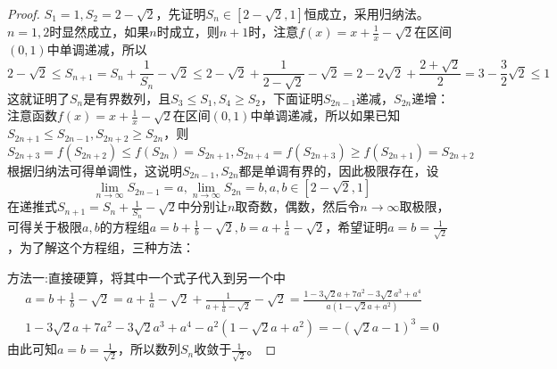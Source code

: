 \documentclass[../../main.tex]{subfiles}%
\begin{document}
\begin{proof}
\(S_1 = 1,S_2 = 2-\sqrt{2}\)，先证明\(S_n\in[2 - \sqrt{2},1]\)恒成立，采用归纳法。
\(n = 1,2\)时显然成立，如果\(n\)时成立，则\(n + 1\)时，注意\(f(x)=x+\frac{1}{x}-\sqrt{2}\)在区间\((0,1)\)中单调递减，所以
\[2-\sqrt{2}\leqslant  S_{n + 1}=S_n+\frac{1}{S_n}-\sqrt{2}\leqslant 2-\sqrt{2}+\frac{1}{2 - \sqrt{2}}-\sqrt{2}=2-2\sqrt{2}+\frac{2+\sqrt{2}}{2}=3-\frac{3}{2}\sqrt{2}\leqslant 1\]
这就证明了\(S_n\)是有界数列，且\(S_3\leqslant  S_1,S_4\geqslant  S_2\)，下面证明\(S_{2n - 1}\)递减，\(S_{2n}\)递增：
注意函数\(f(x)=x+\frac{1}{x}-\sqrt{2}\)在区间\((0,1)\)中单调递减，所以如果已知\(S_{2n + 1}\leqslant  S_{2n - 1},S_{2n + 2}\geqslant  S_{2n}\)，则
\[S_{2n + 3}=f(S_{2n + 2})\leqslant  f(S_{2n})=S_{2n + 1},S_{2n + 4}=f(S_{2n + 3})\geqslant  f(S_{2n + 1})=S_{2n + 2}\]
根据归纳法可得单调性，这说明\(S_{2n - 1},S_{2n}\)都是单调有界的，因此极限存在，设
\[\lim_{n\rightarrow\infty}S_{2n - 1}=a,\lim_{n\rightarrow\infty}S_{2n}=b,a,b\in[2 - \sqrt{2},1]\]
在递推式\(S_{n + 1}=S_n+\frac{1}{S_n}-\sqrt{2}\)中分别让\(n\)取奇数，偶数，然后令\(n\rightarrow\infty\)取极限，可得关于极限\(a,b\)的方程组\(a = b+\frac{1}{b}-\sqrt{2},b = a+\frac{1}{a}-\sqrt{2}\)，希望证明\(a = b=\frac{1}{\sqrt{2}}\)，为了解这个方程组，三种方法：

{\color{blue}方法一:}直接硬算，将其中一个式子代入到另一个中
\begin{align*}
a=b+\frac{1}{b}-\sqrt{2}=a+\frac{1}{a}-\sqrt{2}+\frac{1}{a+\frac{1}{a}-\sqrt{2}}-\sqrt{2}=\frac{1 - 3\sqrt{2}a + 7a^2-3\sqrt{2}a^3 + a^4}{a(1-\sqrt{2}a + a^2)}\\
1 - 3\sqrt{2}a + 7a^2-3\sqrt{2}a^3 + a^4-a^2(1-\sqrt{2}a + a^2)=-\left(\sqrt{2}a - 1\right)^3=0
\end{align*}
由此可知\(a = b=\frac{1}{\sqrt{2}}\)，所以数列\(S_n\)收敛于\(\frac{1}{\sqrt{2}}\)。


\end{proof}
\end{document}
